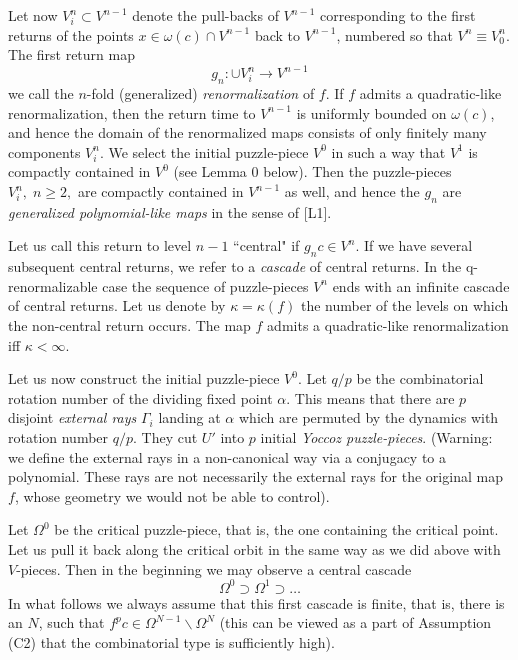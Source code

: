 Let now $V^n_i\subset V^{n-1}$ denote the pull-backs of $V^{n-1}$
corresponding to the first returns of the points  
$x\in\omega(c)\cap V^{n-1}$ back to $V^{n-1}$, 
numbered so that $V^n\equiv V^n_0$.
 The first return map
$$g_n : \cup V^n_i\rightarrow V^{n-1}$$
we call the $n$-fold (generalized) {\sl renormalization} of $f$. 
If  $f$ admits a quadratic-like renormalization,
 then the return time to $V^{n-1}$ is uniformly
bounded on $\omega (c)$, and hence the domain of the renormalized
maps consists of only finitely many components $V^n_i$.
We select the initial puzzle-piece $V^0$ in such a way that
$V^1$ is compactly contained in $V^0$ (see Lemma 0 below). 
Then the puzzle-pieces $V^n_i,\; n\geq 2,$ are
 compactly contained in $V^{n-1}$ as well, and hence 
 the $g_n$ are 
{\sl generalized polynomial-like maps}
in the sense of [L1].

 Let us call this return to level $n-1$ ``central" if $g_n c\in V^n$.
If we have several subsequent central returns, we refer to a
{\sl cascade} of central returns. In the q-renormalizable case the
sequence of puzzle-pieces $V^n$ ends with an infinite cascade of central
returns.  Let us denote by $\kappa=\kappa(f)$ the number of the levels
on which the  non-central return occurs. The map $f$ 
 admits a quadratic-like renormalization 
iff $\kappa<\infty$.  

Let us now construct the initial puzzle-piece $V^0$.  Let $q/p$ be the
combinatorial rotation number of the dividing fixed point $\alpha$.
This means that
there are $p$ disjoint {\sl external rays} $\Gamma_i$
 landing at $\alpha$ which are permuted by the 
dynamics with rotation number $q/p$.  They cut $U'$
 into $p$ initial {\sl Yoccoz puzzle-pieces}. 
(Warning: 
we define the external rays in a
non-canonical way via a conjugacy to a polynomial. These rays are not
necessarily the external rays for the original map $f$, whose
geometry we would not be able to control).

Let $\Omega^0$ be  the  critical puzzle-piece, that is, the one
containing the critical point. 
Let us pull it back along the critical orbit in the same way as we did above
with $V$-pieces.
Then in the beginning we may observe a central cascade 
$$\Omega^0\supset \Omega^1\supset \ldots$$
In what follows we always assume that this first cascade is finite,
that is, there is an $N$, such that
$f^p c\in \Omega^{N-1}\backslash \Omega^N$
(this can be viewed as a part of  Assumption (C2) that the combinatorial type
is sufficiently high). 


